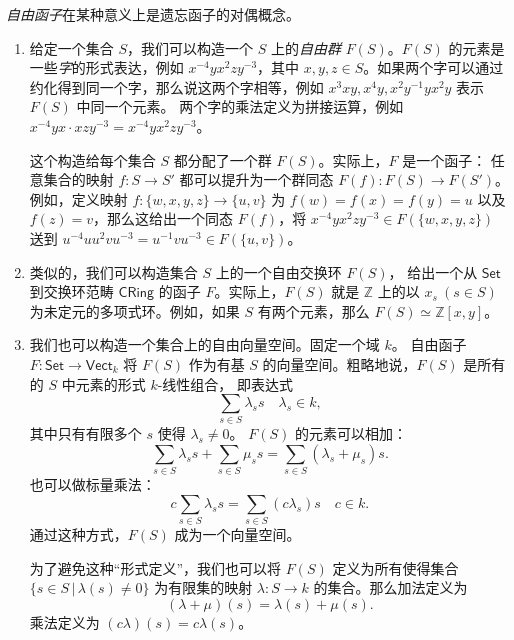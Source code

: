\documentclass[fontset=none]{Notes}
\newcommand{\cat}[1]{\mathsf{#1}}
\begin{document}
\begin{example}
  \emph{自由函子}在某种意义上是遗忘函子的对偶概念。
  \begin{enumerate}
    \item 给定一个集合 $S$，我们可以构造一个 $S$ 上的\emph{自由群}
    $F(S)$。$F(S)$ 的元素是一些\emph{字}的形式表达，例如
    $x^{-4}yx^2zy^{-3}$，其中 $x,y,z\in S$。如果两个字可以通过
    约化得到同一个字，那么说这两个字相等，例如
    $x^3xy,x^4y,x^2y^{-1}yx^2y$ 表示 $F(S)$ 中同一个元素。
    两个字的乘法定义为拼接运算，例如 $x^{-4}yx\cdot xzy^{-3}=x^{-4}yx^2zy^{-3}$。

    这个构造给每个集合 $S$ 都分配了一个群 $F(S)$。实际上，$F$ 是一个函子：
    任意集合的映射 $f:S\to S'$ 都可以提升为一个群同态 $F(f):F(S)\to F(S')$。
    例如，定义映射 $f:\{w,x,y,z\}\to\{u,v\}$ 为 $f(w)=f(x)=f(y)=u$
    以及 $f(z)=v$，那么这给出一个同态
    $F(f)$，将 $x^{-4}yx^2zy^{-3}\in F(\{w,x,y,z\})$ 
    送到 $u^{-4}uu^2vu^{-3}=u^{-1}vu^{-3}\in F(\{u,v\})$。
    \item 类似的，我们可以构造集合 $S$ 上的一个自由交换环 $F(S)$，
    给出一个从 $\cat{Set}$ 到交换环范畴 $\cat{CRing}$ 
    的函子 $F$。实际上，$F(S)$ 就是 $\mathbb{Z}$ 上的以 $x_s\ (s\in S)$
    为未定元的多项式环。例如，如果 $S$ 有两个元素，那么
    $F(S)\simeq \mathbb{Z}[x,y]$。
    \item 我们也可以构造一个集合上的自由向量空间。固定一个域 $k$。
    自由函子 $F:\cat{Set}\to\cat{Vect}_k$ 将 $F(S)$ 作为有基 $S$
    的向量空间。粗略地说，$F(S)$ 是所有的 $S$ 中元素的形式 $k$-线性组合，
    即表达式
    \[
      \sum_{s\in S}\lambda_ss\quad \lambda_s\in k,  
    \]
    其中只有有限多个 $s$ 使得 $\lambda_s\neq 0$。
    $F(S)$ 的元素可以相加：
    \[
      \sum_{s\in S}\lambda_ss+\sum_{s\in S}\mu_ss=\sum_{s\in S}
      (\lambda_s+\mu_s)s.  
    \]
    也可以做标量乘法：
    \[
      c\sum_{s\in S}\lambda_ss=\sum_{s\in S}(c\lambda_s)s\quad c\in k.  
    \]
    通过这种方式，$F(S)$ 成为一个向量空间。

    为了避免这种“形式定义”，我们也可以将 $F(S)$ 定义为所有使得集合
    $\{s\in S\,|\, \lambda(s)\ne 0\}$ 为有限集的映射
    $\lambda:S\to k$ 的集合。那么加法定义为
    \[
      (\lambda+\mu)(s)=\lambda(s)+\mu(s).  
    \]
    乘法定义为 $(c\lambda)(s)=c\lambda(s)$。
  \end{enumerate}
\end{example}
\end{document}
